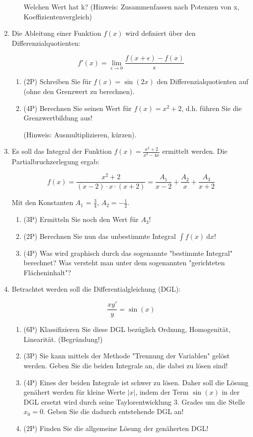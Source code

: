 \documentclass[11pt]{article}
\providecommand\d{}
\renewcommand{\d}[1]{\:\mathrm{d}{#1}}
\begin{document}
\begin{enumerate}
\begin{enumerate}
Welchen Wert hat k? (Hinweis: Zusammenfassen nach Potenzen von x, Koeffizientenvergleich)

\end{enumerate}

\item Die Ableitung einer Funktion $f(x)$ wird definiert über den Differenzialquotienten:

$$f'(x) = \lim\limits_{\epsilon\to 0} \frac{f(x+\epsilon)-f(x)}{\epsilon}$$

\begin{enumerate}
\item (2P) Schreiben Sie für $f(x)=\sin(2x)$ den Differenzialquotienten auf (ohne den Grenzwert zu berechnen).
\item (4P) Berechnen Sie seinen Wert für $f(x)=x^2+2$, d.h. führen Sie die Grenzwertbildung aus!

(Hinweis: Ausmultiplizieren, kürzen).
\end{enumerate}

\item Es soll das Integral der Funktion $f(x) = \frac{x^2+2}{x^3-4x}$ ermittelt werden. Die Partialbruchzerlegung ergab:

$$f(x) = \frac{x^2+2}{(x-2)\cdot x\cdot (x+2)} = \frac{A_1}{x-2} + \frac{A_2}{x} + \frac{A_3}{x+2}$$

Mit den Konstanten $A_1$ = $\frac{3}{4}$, $A_2=-\frac{1}{2}$.

\begin{enumerate}
\item (3P) Ermitteln Sie noch den Wert für $A_3$!
\item (2P) Berechnen Sie nun das unbestimmte Integral $\int f(x) \d x$!
\item (4P) Was wird graphisch durch das sogenannte "bestimmte Integral" berechnet? Was versteht man unter dem sogenannten "gerichteten Flächeninhalt"?
\end{enumerate}

\item Betrachtet werden soll die Differentialgleichung (DGL):

$$\frac{xy'}{y} = \sin(x)$$

\begin{enumerate}
\item (6P) Klassifizieren Sie diese DGL bezüglich Ordnung, Homogenität, Linearität. (Begründung!)
\item (3P) Sie kann mittels der Methode "Trennung der Variablen" gelöst werden. Geben Sie die beiden Integrale an, die dabei zu lösen sind!
\item (4P) Eines der beiden Integrale ist schwer zu lösen. Daher soll die Lösung genähert werden für kleine Werte $|x|$, indem der Term $\sin(x)$ in der DGL ersetzt wird durch seine Taylorentwicklung 3. Grades um die Stelle $x_0=0$. Geben Sie die dadurch entstehende DGL an!
\item (2P) Finden Sie die allgemeine Lösung der genäherten DGL!
\end{enumerate}

\end{enumerate}
\end{document}
